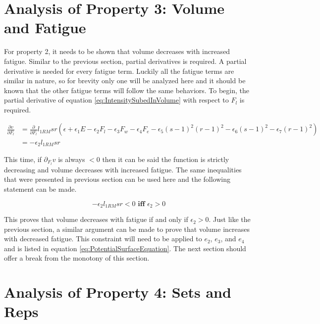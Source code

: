 \section{Analysis of Property 3: Volume and Fatigue}
\label{sec:PotentialSurfaceAnalysisOfProperty3}

For property 2, it needs to be shown that volume decreases with increased fatigue. Similar to the previous section, partial derivatives is required. A partial derivative is needed for every fatigue term. Luckily all the fatigue terms are similar in nature, so for brevity only one will be analyzed here and it should be known that the other fatigue terms will follow the same behaviors. To begin, the partial derivative of equation \ref{eq:IntensitySubedInVolume} with respect to $F_l$ is required.

\begin{equation*}
    \begin{split}
    		\frac{\partial v}{\partial F_l} & =
    		\frac{\partial}{\partial F_l} l_{1RM} sr\left( 
    			\epsilon+
    			\epsilon_1 E-
    			\epsilon_2 F_l-
    			\epsilon_3 F_w-
    			\epsilon_4 F_e-
    			\epsilon_5(s-1)^2(r-1)^2-
    			\epsilon_6(s-1)^2-
    			\epsilon_7(r-1)^2
    		\right) \\
    		& = -\epsilon_2 l_{1RM} sr
    \end{split}
\end{equation*}

This time, if $\partial_{F_l}v$ is always $<0$ then it can be said the function is strictly decreasing and volume decreases with increased fatigue. The same inequalities that were presented in previous section can be used here and the following statement can be made.

\begin{equation*}
    -\epsilon_2 l_{1RM} sr< 0 \textbf{ iff } \epsilon_2> 0
\end{equation*}

This proves that volume decreases with fatigue if and only if $\epsilon_2>0$. Just like the previous section, a similar argument can be made to prove that volume increases with decreased fatigue. This constraint will need to be applied to $e_2$, $e_3$, and $e_4$ and is listed in equation \ref{eq:PotentialSurfaceEquation}. The next section should offer a break from the monotony of this section.

\section{Analysis of Property 4: Sets and Reps}
\label{sec:PotentialSurfaceAnalysisOfProperty4}

